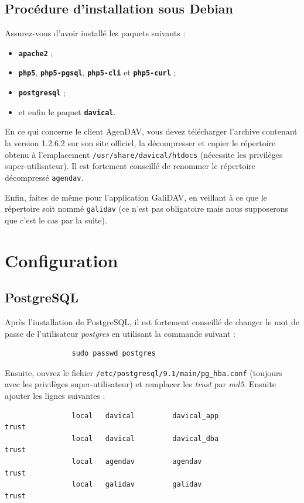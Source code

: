 \documentclass[a4paper, 11pt]{report}
\begin{document}
		\section{Procédure d’installation sous Debian}
			Assurez-vous d’avoir installé les paquets suivants :
			\begin{itemize}
				\item \texttt{\textbf{apache2}} ;
				\item \texttt{\textbf{php5}}, \texttt{\textbf{php5-pgsql}}, \texttt{\textbf{php5-cli}} et \texttt{\textbf{php5-curl}} ;
				\item \texttt{\textbf{postgresql}} ;
				\item et enfin le paquet \texttt{\textbf{davical}}.
			\end{itemize}

			En ce qui concerne le client AgenDAV, vous devez télécharger l’archive contenant la version 1.2.6.2 sur son site officiel, la décompresser et copier le répertoire obtenu à l’emplacement \texttt{/usr/share/davical/htdocs} (nécessite les privilèges super-utilisateur). Il est fortement conseillé de renommer le répertoire décompressé \texttt{agendav}.

			Enfin, faites de même pour l’application GaliDAV, en veillant à ce que le répertoire soit nommé \texttt{galidav} (ce n’est pas obligatoire mais nous supposerons  que c’est le cas par la suite).
	\chapter{Configuration}
		\section{PostgreSQL}
			Après l’installation de PostgreSQL, il est fortement conseillé de changer le mot de passe de l’utilisateur \textit{postgres} en utilisant la commande suivant :
			\begin{verbatim}
				sudo passwd postgres
			\end{verbatim}

			Ensuite, ouvrez le fichier \texttt{/etc/postgresql/9.1/main/pg\_hba.conf} (toujours avec les privilèges super-utilisateur) et remplacer les \textit{trust} par \textit{md5}. Ensuite ajouter les lignes suivantes :
			\begin{verbatim}
				local   davical         davical_app                             trust
				local   davical         davical_dba                             trust
				local   agendav         agendav                                 trust
				local   galidav         galidav                                 trust
			\end{verbatim}
\end{document}
